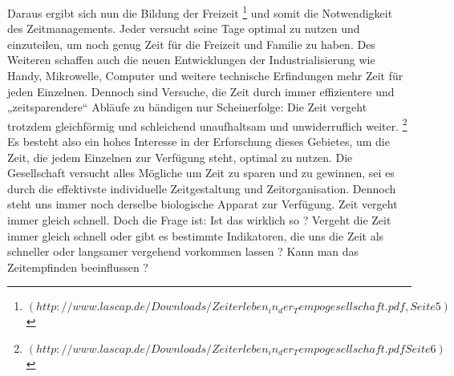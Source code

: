 \documentclass{Paper}
\begin{document}
Daraus ergibt sich nun die Bildung der Freizeit \footnote{$( http://www.lascap.de/Downloads/Zeiterleben_in_der_Tempogesellschaft.pdf, Seite 5)$} und somit die Notwendigkeit des Zeitmanagements. Jeder versucht seine Tage optimal zu nutzen und einzuteilen, um noch genug Zeit für die Freizeit und Familie zu haben. Des Weiteren schaffen auch die neuen Entwicklungen der Industrialisierung wie Handy, Mikrowelle, Computer und weitere technische Erfindungen mehr Zeit für jeden Einzelnen. Dennoch sind Versuche, die Zeit durch immer effizientere und „zeitsparendere“ Abläufe zu bändigen nur Scheinerfolge: Die Zeit vergeht trotzdem gleichförmig und schleichend unaufhaltsam und unwiderruflich weiter. \footnote{$( http://www.lascap.de/Downloads/Zeiterleben_in_der_Tempogesellschaft.pdf Seite 6)$} Es besteht also ein hohes Interesse in der Erforschung dieses Gebietes, um die Zeit, die jedem Einzelnen zur Verfügung steht, optimal zu nutzen. Die Gesellschaft versucht alles Mögliche um Zeit zu sparen und zu gewinnen, sei es durch die effektivste individuelle Zeitgestaltung und Zeitorganisation. Dennoch steht uns immer noch derselbe biologische Apparat zur Verfügung. Zeit vergeht immer gleich schnell. Doch die Frage ist: Ist das wirklich so ? Vergeht die Zeit immer gleich schnell oder gibt es bestimmte Indikatoren, die uns die Zeit als schneller oder langsamer vergehend vorkommen lassen ? Kann man das Zeitempfinden beeinflussen ? 
\end{document}
